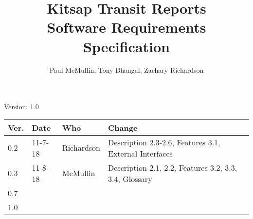 \documentclass[letterpaper,12pt]{article}
\title{Kitsap Transit Reports\\Software Requirements Specification}
\author{Paul McMullin, Tony Bhangal, Zachary Richardson}
\begin{document}
\maketitle

\begin{center}
  Version: 1.0
\end{center}

\vfill
\begin{tabularx}{\linewidth}{|l|l|l|X|l|}\hline
Ver. & Date & Who & Change \\\hline
0.2     &  11-7-18    &  Richardson   &   Description 2.3-2.6, Features 3.1, External Interfaces  \\\hline
0.3     &  11-8-18    &  McMullin   &  Description 2.1, 2.2, Features 3.2, 3.3, 3.4, Glossary \\\hline
0.7  &      &     &          \\\hline
1.0  &      &     &         \\\hline
\end{tabularx}

\newpage







\appendix 

%
%
\end{document}
